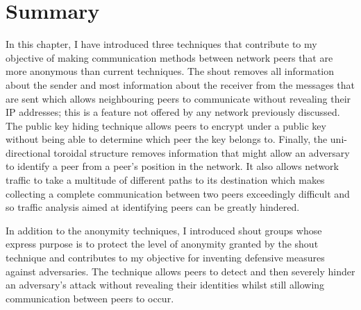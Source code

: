 \documentclass[ %
                    author={Luke Murray},
                supervisor={Dr. Simon Hollis},
                     title={Shadow Peer-to-Peer Networks},
                  subtitle={},
                    degree={MEng},
                      year={2013} ]{thesis}
\begin{document}

\section{Summary}

In this chapter, I have introduced three techniques that contribute to my objective of making communication methods between network peers that are more anonymous than current techniques. The shout removes all information about the sender and most information about the receiver from the messages that are sent which allows neighbouring peers to communicate without revealing their IP addresses; this is a feature not offered by any network previously discussed. The public key hiding technique allows peers to encrypt under a public key without being able to determine which peer the key belongs to. Finally, the uni-directional toroidal structure removes information that might allow an adversary to identify a peer from a peer's position in the network. It also allows network traffic to take a multitude of different paths to its destination which makes collecting a complete communication between two peers exceedingly difficult and so traffic analysis aimed at identifying peers can be greatly hindered. 

In addition to the anonymity techniques, I introduced shout groups whose express purpose is to protect the level of anonymity granted by the shout technique and contributes to my objective for inventing defensive measures against adversaries. The technique allows peers to detect and then severely hinder an adversary's attack without revealing their identities whilst still allowing communication between peers to occur.
\end{document}
